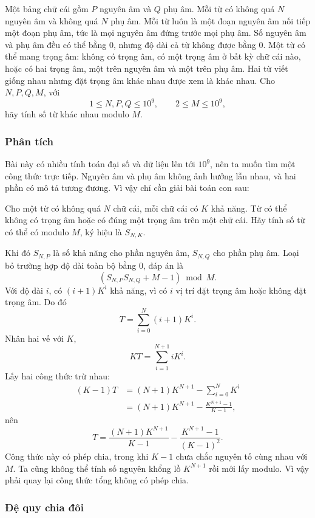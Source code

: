 \documentclass[11pt]{article}
\begin{document}
Một bảng chữ cái gồm \(P\) nguyên âm và \(Q\) phụ âm. Mỗi từ có không quá
\(N\) nguyên âm và không quá \(N\) phụ âm. Mỗi từ luôn là một đoạn nguyên âm
nối tiếp một đoạn phụ âm, tức là mọi nguyên âm đứng trước mọi phụ âm. Số
nguyên âm và phụ âm đều có thể bằng \(0\), nhưng độ dài cả từ không được bằng
\(0\). Một từ có thể mang trọng âm: không có trọng âm, có một trọng âm ở bất
kỳ chữ cái nào, hoặc có hai trọng âm, một trên nguyên âm và một trên phụ âm.
Hai từ viết giống nhau nhưng đặt trọng âm khác nhau được xem là khác nhau.
Cho \(N,P,Q,M\), với
\[
  1\le N,P,Q\le 10^9,\qquad 2\le M\le 10^9,
\]
hãy tính số từ khác nhau modulo \(M\).

\subsubsection{Phân tích}

Bài này có nhiều tính toán đại số và dữ liệu lên tới \(10^9\), nên ta muốn
tìm một công thức trực tiếp. Nguyên âm và phụ âm không ảnh hưởng lẫn nhau, và
hai phần có mô tả tương đương. Vì vậy chỉ cần giải bài toán con sau:

Cho một từ có không quá \(N\) chữ cái, mỗi chữ cái có \(K\) khả năng. Từ có
thể không có trọng âm hoặc có đúng một trọng âm trên một chữ cái. Hãy tính số
từ có thể có modulo \(M\), ký hiệu là \(S_{N,K}\).

Khi đó \(S_{N,P}\) là số khả năng cho phần nguyên âm, \(S_{N,Q}\) cho phần phụ
âm. Loại bỏ trường hợp độ dài toàn bộ bằng \(0\), đáp án là
\[
  (S_{N,P}S_{N,Q}+M-1)\bmod M.
\]
Với độ dài \(i\), có \((i+1)K^i\) khả năng, vì có \(i\) vị trí đặt trọng âm
hoặc không đặt trọng âm. Do đó
\[
  T=\sum_{i=0}^{N}(i+1)K^i.
\]
Nhân hai vế với \(K\),
\[
  KT=\sum_{i=1}^{N+1}iK^i.
\]
Lấy hai công thức trừ nhau:
\[
\begin{aligned}
  (K-1)T
  &=(N+1)K^{N+1}-\sum_{i=0}^{N}K^i\\
  &=(N+1)K^{N+1}-\frac{K^{N+1}-1}{K-1},
\end{aligned}
\]
nên
\[
  T=\frac{(N+1)K^{N+1}}{K-1}
  -\frac{K^{N+1}-1}{(K-1)^2}.
\]
Công thức này có phép chia, trong khi \(K-1\) chưa chắc nguyên tố cùng nhau
với \(M\). Ta cũng không thể tính số nguyên khổng lồ \(K^{N+1}\) rồi mới lấy
modulo. Vì vậy phải quay lại công thức tổng không có phép chia.

\subsubsection{Đệ quy chia đôi}
\end{document}
